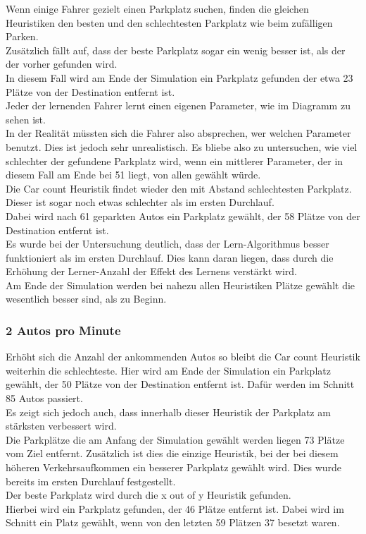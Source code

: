 Wenn einige Fahrer gezielt einen Parkplatz suchen, finden die gleichen Heuristiken den besten und den schlechtesten Parkplatz wie beim zufälligen Parken.\\
Zusätzlich fällt auf, dass der beste Parkplatz sogar ein wenig besser ist, als der der vorher gefunden wird.\\
In diesem Fall wird am Ende der Simulation ein Parkplatz gefunden der etwa 23 Plätze von der Destination entfernt ist.\\
Jeder der lernenden Fahrer lernt einen eigenen Parameter, wie im Diagramm zu sehen ist.\\
In der Realität müssten sich die Fahrer also absprechen, wer welchen Parameter benutzt. Dies ist jedoch sehr unrealistisch. Es bliebe also zu untersuchen, wie viel schlechter der gefundene Parkplatz wird, wenn ein mittlerer Parameter, der in diesem Fall am Ende bei 51 liegt, von allen gewählt würde.\\
Die Car count Heuristik findet wieder den mit Abstand schlechtesten Parkplatz. Dieser ist sogar noch etwas schlechter als im ersten Durchlauf.\\
Dabei wird nach 61 geparkten Autos ein Parkplatz gewählt, der 58 Plätze von der Destination entfernt ist.\\

Es wurde bei der Untersuchung deutlich, dass der Lern-Algorithmus besser funktioniert als im ersten Durchlauf. Dies kann daran liegen, dass durch die Erhöhung der Lerner-Anzahl der Effekt des Lernens verstärkt wird.\\
Am Ende der Simulation werden bei nahezu allen Heuristiken Plätze gewählt die wesentlich besser sind, als zu Beginn.

\subsubsection{2 Autos pro Minute}

Erhöht sich die Anzahl der ankommenden Autos so bleibt die Car count Heuristik weiterhin die schlechteste.
Hier wird am Ende der Simulation ein Parkplatz gewählt, der 50 Plätze von der Destination entfernt ist. Dafür werden im Schnitt 85 Autos passiert.\\
Es zeigt sich jedoch auch, dass innerhalb dieser Heuristik der Parkplatz am stärksten verbessert wird.\\
Die Parkplätze die am Anfang der Simulation gewählt werden liegen 73 Plätze vom Ziel entfernt. Zusätzlich ist dies die einzige Heuristik, bei der bei diesem höheren Verkehrsaufkommen ein besserer Parkplatz gewählt wird. Dies wurde bereits im ersten Durchlauf festgestellt.\\
Der beste Parkplatz wird durch die x out of y Heuristik gefunden.\\
Hierbei wird ein Parkplatz gefunden, der 46 Plätze entfernt ist. Dabei wird im Schnitt ein Platz gewählt, wenn von den letzten 59 Plätzen 37 besetzt waren.

